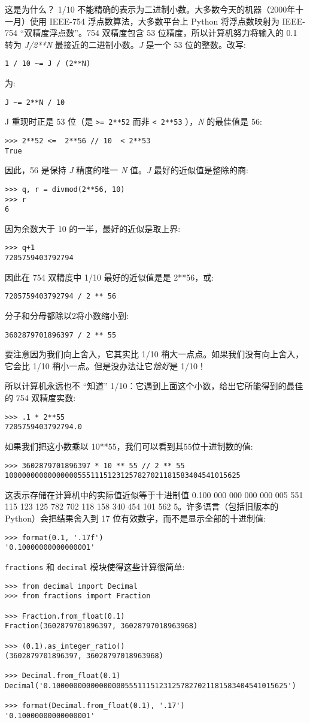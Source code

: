 这是为什么？ 1/10 不能精确的表示为二进制小数。大多数今天的机器（2000年十一月）使用 IEEE-754 浮点数算法，大多数平台上 Python 将浮点数映射为 IEEE-754 “双精度浮点数”。754 双精度包含 53 位精度，所以计算机努力将输入的 0.1 转为 \textit{J/2**N} 最接近的二进制小数。\textit{J} 是一个 53 位的整数。改写:
\begin{lstlisting}
1 / 10 ~= J / (2**N)
\end{lstlisting}
为:
\begin{lstlisting}
J ~= 2**N / 10
\end{lstlisting}
J 重现时正是 53 位（是 \texttt{>= 2**52} 而非 \texttt{< 2**53} ），\textit{N} 的最佳值是 56:
\begin{lstlisting}
>>> 2**52 <=  2**56 // 10  < 2**53
True
\end{lstlisting}
因此，56 是保持 \textit{J} 精度的唯一 \textit{N} 值。\textit{J} 最好的近似值是整除的商:
\begin{lstlisting}
>>> q, r = divmod(2**56, 10)
>>> r
6
\end{lstlisting}
因为余数大于 10 的一半，最好的近似是取上界:
\begin{lstlisting}
>>> q+1
7205759403792794
\end{lstlisting}
因此在 754 双精度中 1/10 最好的近似值是是 2**56，或:
\begin{lstlisting}
7205759403792794 / 2 ** 56
\end{lstlisting}
分子和分母都除以2将小数缩小到:
\begin{lstlisting}
3602879701896397 / 2 ** 55
\end{lstlisting}
要注意因为我们向上舍入，它其实比 1/10 稍大一点点。如果我们没有向上舍入，它会比 1/10 稍小一点。但是没办法让它\textit{恰好}是 1/10！

所以计算机永远也不 “知道” 1/10：它遇到上面这个小数，给出它所能得到的最佳的 754 双精度实数:
\begin{lstlisting}
>>> .1 * 2**55
7205759403792794.0
\end{lstlisting}
如果我们把这小数乘以 10**55，我们可以看到其55位十进制数的值:
\begin{lstlisting}
>>> 3602879701896397 * 10 ** 55 // 2 ** 55
1000000000000000055511151231257827021181583404541015625
\end{lstlisting}
这表示存储在计算机中的实际值近似等于十进制值 0.100 000 000 000 000 005 551 115 123 125 782 702 118 158 340 454 101 562 5。许多语言（包括旧版本的Python）会把结果舍入到 17 位有效数字，而不是显示全部的十进制值:
\begin{lstlisting}
>>> format(0.1, '.17f')
'0.10000000000000001'
\end{lstlisting}
\texttt{fractions} 和 \texttt{decimal} 模块使得这些计算很简单:
\begin{lstlisting}
>>> from decimal import Decimal
>>> from fractions import Fraction

>>> Fraction.from_float(0.1)
Fraction(3602879701896397, 36028797018963968)

>>> (0.1).as_integer_ratio()
(3602879701896397, 36028797018963968)

>>> Decimal.from_float(0.1)
Decimal('0.1000000000000000055511151231257827021181583404541015625')

>>> format(Decimal.from_float(0.1), '.17')
'0.10000000000000001'
\end{lstlisting} 